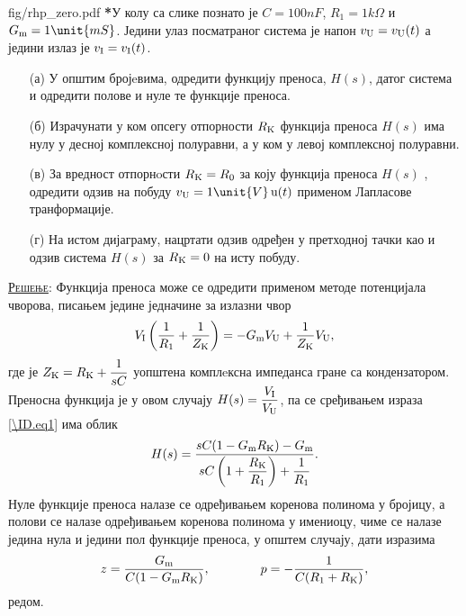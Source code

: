 \begin{slikaDesno}[0.83]{fig/rhp_zero.pdf}
    \textbf{\color{red}*}\PID У колу са слике познато је $C = 100\unit{nF}$, 
    $R_1 = 1\unit{k\Omega}$ и
    $G_{\rm m} = 1\unit{mS}$.
    Једини улаз посматраног система је напон 
    $v_{\rm U} = v_{\rm U}(t)$ а једини излаз је 
    $v_{\rm I} = v_{\rm I}(t)$.
    \begin{itemize}
    \item[(а)] 
    У општим бројeвима, 
    одредити функцију преноса, $H(s)$, датог 
    система
    и одредити полове и нуле те функције 
    преноса. 

    \item[(б)] 
    Израчунати у ком опсегу отпорности 
    $R_{\rm K}$ функција преноса $H(s)$
    има нулу у десној комплексној полуравни, 
    а у ком у
    левој комплексној полуравни.
\end{itemize}
\end{slikaDesno}
%
\begin{itemize}
    \item[(в)] За вредност отпорнoсти 
    $R_{\rm K} = R_0$ за коју функција преноса 
    $H(s)$ 
    , одредити одзив на побуду 
    $v_{\rm U} = 1\unit{V}\,{\rm u}(t)$
    применом Лапласове транформације.
    
    \item[(г)] На истом дијаграму, нацртати 
    одзив одређен у претходној тачки као и
    одзив система $H(s)$ за $R_{\rm K} = 0$ 
    на исту побуду. 
\end{itemize} 

\textsc{\underline{Решење}}: Функција преноса може се одредити применом методе 
потенцијала чворова, писањем једине једначине за излазни чвор 
\begin{equation}
    V_{\rm I} \left( \dfrac{1}{R_1} + \dfrac{1}{Z_{\rm K}} \right) = - G_{\rm m} V_{\rm U} + \dfrac{1}{Z_{\rm K}} V_{\rm U}, \label{\ID.eq1}
\end{equation}
где је $Z_{\rm K} = R_{\rm K} + \dfrac{1}{sC}$ уопштена комплeксна импеданса гране са кондензатором. Преносна функција је 
у овом случају $H(s) = \dfrac{V_{\rm I}}{V_{\rm U}}$, па се сређивањем израза \ref{\ID.eq1} има облик 
\begin{equation}
    H(s) = \dfrac{sC(1 - G_{\rm m}R_{\rm K} ) - G_{\rm m} }{ sC\left(1 + \dfrac{R_{\rm K}}{R_1}\right) + \dfrac{1}{R_1} }. \label{\ID.eq2}
\end{equation}
Нуле функције преноса налазе се одређивањем коренова полинома у бројицу, а полови се налазе  одређивањем коренова полинома у имениоцу, чиме се 
налазе једина нула и једини пол функције преноса, у општем случају, дати изразима
\begin{equation}
    z = \dfrac{G_{\rm m}}{C(1 - G_{\rm m} R_{\rm K})}, \qquad \qquad p = - \dfrac{1}{C(R_1 + R_{\rm K})},
\end{equation}
редом.

